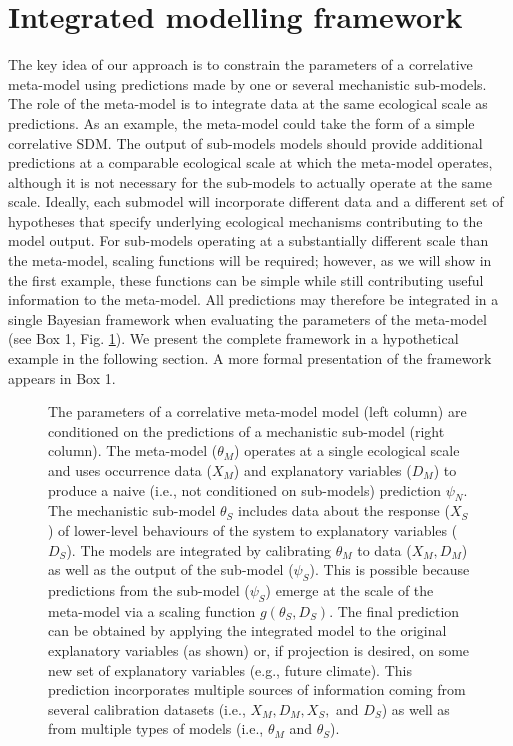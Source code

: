 
\section*{Integrated modelling framework}

The key idea of our approach is to constrain the parameters of a correlative meta-model using predictions made by one or several mechanistic sub-models.
The role of the meta-model is to integrate data at the same ecological scale as predictions. 
As an example, the meta-model could take the form of a simple correlative \ac{SDM}.
The output of sub-models models should provide additional predictions at a comparable ecological scale at which the meta-model operates, although it is not necessary for the sub-models to actually operate at the same scale.
Ideally, each submodel will incorporate different data and a different set of hypotheses that specify underlying ecological mechanisms contributing to the model output.
For sub-models operating at a substantially different scale than the meta-model, scaling functions will be required; however, as we will show in the first example, these functions can be simple while still contributing useful information to the meta-model. 
All predictions may therefore be integrated in a single Bayesian framework when evaluating the parameters of the meta-model (see Box 1, Fig. \ref{fig:diagram}).
We present the complete framework in a hypothetical example in the following section.
A more formal presentation of the framework appears in Box 1.


\begin{figure}

\caption{The parameters of a correlative meta-model model (left column) are conditioned on the predictions of a mechanistic sub-model (right column).
The meta-model ($\theta_M$) operates at a single ecological scale and uses occurrence data (\(X_M\)) and explanatory variables ($D_M$) to produce a naive (i.e., not conditioned on sub-models) prediction $\psi_N$.
The mechanistic sub-model \(\theta_S\) includes data about the response (\(X_S\)) of lower-level behaviours of the system to explanatory variables ($D_S$). 
The models are integrated by calibrating $\theta_M$ to data ($X_M, D_M$) as well as the output of the sub-model ($\psi_S$). 
This is possible because predictions from the sub-model ($\psi_S$) emerge at the scale of the meta-model via a scaling function \(g(\theta_S, D_S)\).
The final prediction can be obtained by applying the integrated model to the original explanatory variables (as shown) or, if projection is desired, on some new set of explanatory variables (e.g., future climate).
This prediction incorporates multiple sources of information coming from several calibration datasets (i.e., $X_M, D_M, X_S, $ and $D_S$) as well as from multiple types of models (i.e., $\theta_M$ and $\theta_S$).
}
\label{fig:diagram}
\end{figure}

